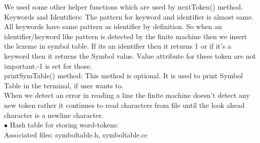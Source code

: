 \documentclass[paper=letter, fontsize=12pt]{scrartcl} %
\begin{document}
We used some other helper functions which are used by nextToken() method.\\

Keywords and Identifiers: The pattern for keyword and identifier is almost same. All keywords have same pattern as identifier by definition. So when an identifier/keyword like pattern is detected by the finite machine then we insert the lexeme in symbol table. If its an identifier then it returns 1 or if it's a keyword then it returns the Symbol value. Value attribute for these token are not important.-1 is set for those.\\

printSymTable() method: This method is optional. It is used to print Symbol Table in the terminal, if user wants to.\\

When we detect an error in reading a line the finite machine doesn't detect any new token rather it continues to read characters from file until the look ahead character is a newline character.\\

$\bullet$ Hash table for storing word-tokens: \\

Associated files: symboltable.h, symboltable.cc\\
\end{document}
